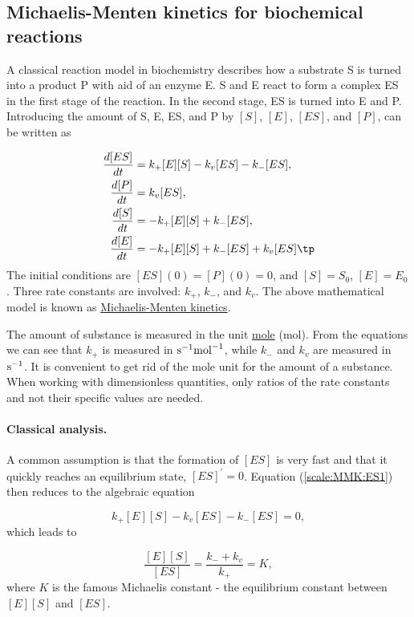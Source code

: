 \documentclass[graybox,envcountchap,sectrefs,final]{svmonodo}
\begin{document}
\subsection{Michaelis-Menten kinetics for biochemical reactions}
\label{scale:MMK}

A classical reaction model in biochemistry describes how a
substrate S is turned into a product P with aid of an enzyme E.
S and E react to form a complex ES in the first stage of the reaction.
In the second stage, ES is turned into E and P.
Introducing the amount of S, E, ES, and P by $[S]$, $[E]$, $[ES]$, and
$[P]$, can be written as

\begin{align}
\frac{d[ES]}{dt} &= k_+[E][S] - k_v[ES] - k_-[ES],
\label{scale:MMK:ES1}\\ 
\frac{d[P]}{dt} &= k_v[ES],
\label{scale:MMK:P1}\\ 
\frac{d[S]}{dt} &= -k_+[E][S] + k_-[ES],
\label{scale:MMK:S1}\\ 
\frac{d[E]}{dt} &= -k_+[E][S] + k_-[ES] + k_v[ES]\tp
\label{scale:MMK:E1}
\end{align}
The initial conditions are $[ES](0)=[P](0)=0$, and $[S]=S_0$, $[E]=E_0$.
Three rate constants are involved: $k_+$, $k_-$, and $k_v$.
The above mathematical model is known as \href{{https://en.wikipedia.org/wiki/Michaelis-Menten_kinetics}}{Michaelis-Menten kinetics}.

The amount of substance is measured in the unit \href{{https://en.wikipedia.org/wiki/Mole_(unit)}}{mole} (mol). From the equations we can see that
$k_+$ is measured in $\hbox{s}^{-1}\hbox{mol}^{-1}$, while $k_-$ and
$k_v$ are measured in $\hbox{s}^{-1}$. It is convenient to get rid of
the mole unit for the amount of a substance. When working with
dimensionless quantities, only ratios of the rate constants and not their
specific values are needed.

\paragraph{Classical analysis.}
A common assumption is that the formation of $[ES]$ is very fast and that
it quickly reaches an equilibrium state, $[ES]^{\prime}=0$. Equation
(\ref{scale:MMK:ES1}) then reduces to the algebraic equation

\[ k_+[E][S] - k_v[ES] - k_-[ES] = 0, \]
which leads to

\begin{equation}
\frac{[E][S]}{[ES]} = \frac{k_- + k_v}{k_+} = K,
\label{scale:MMK:K}
\end{equation}
where $K$ is the famous Michaelis constant - the equilibrium constant
between $[E][S]$ and $[ES]$.
\end{document}
